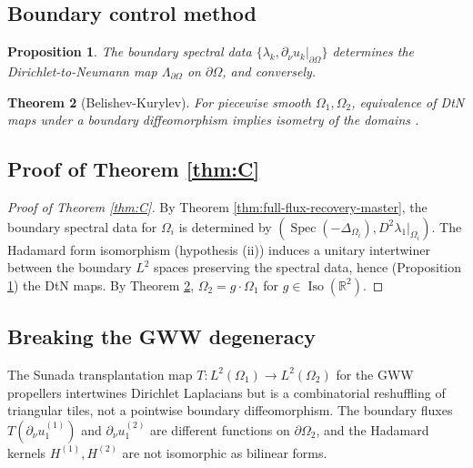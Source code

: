 \documentclass[11pt,reqno]{amsart}
\theoremstyle{plain}
\newtheorem{theorem}{Theorem}[section]
\newtheorem{proposition}[theorem]{Proposition}
\theoremstyle{definition}
\theoremstyle{remark}
\DeclareMathOperator{\Spec}{Spec}
\DeclareMathOperator{\Iso}{Iso}
\newcommand{\Reals}{\mathbb{R}}
\newcommand{\Lambdaop}{\Lambda}
\begin{document}
\subsection{Boundary control method}\label{ss:bc-method-master}

\begin{proposition}\label{prop:DtN-equiv-master}
The boundary spectral data $\{\lambda_k, \partial_\nu u_k|_{\partial\Omega}\}$ determines the Dirichlet-to-Neumann map $\Lambdaop_{\partial\Omega}$ on $\partial\Omega$, and conversely.
\end{proposition}

\begin{theorem}[Belishev-Kurylev]\label{thm:belishev-master}
For piecewise smooth $\Omega_1, \Omega_2$, equivalence of DtN maps under a boundary diffeomorphism implies isometry of the domains \cite{Belishev, LassasUhlmann, SylvesterUhlmann}.
\end{theorem}

\subsection{Proof of Theorem \ref{thm:C}}\label{ss:proof-C-master}

\begin{proof}[Proof of Theorem \ref{thm:C}]
By Theorem \ref{thm:full-flux-recovery-master}, the boundary spectral data for $\Omega_i$ is determined by $(\Spec(-\Delta_{\Omega_i}), D^2\lambda_1|_{\Omega_i})$. The Hadamard form isomorphism (hypothesis (ii)) induces a unitary intertwiner between the boundary $L^2$ spaces preserving the spectral data, hence (Proposition \ref{prop:DtN-equiv-master}) the DtN maps. By Theorem \ref{thm:belishev-master}, $\Omega_2 = g\cdot\Omega_1$ for $g \in \Iso(\Reals^2)$.
\end{proof}

\subsection{Breaking the GWW degeneracy}\label{ss:gww-broken-master}

The Sunada transplantation map $T \colon L^2(\Omega_1) \to L^2(\Omega_2)$ for the GWW propellers intertwines Dirichlet Laplacians but is a combinatorial reshuffling of triangular tiles, not a pointwise boundary diffeomorphism. The boundary fluxes $T(\partial_\nu u_1^{(1)})$ and $\partial_\nu u_1^{(2)}$ are different functions on $\partial\Omega_2$, and the Hadamard kernels $H^{(1)}, H^{(2)}$ are not isomorphic as bilinear forms.
\end{document}
